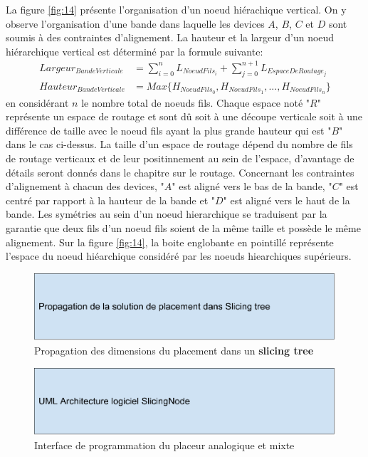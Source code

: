La figure \ref{fig:14} présente l'organisation d'un noeud hiérachique vertical. On y observe l'organisation d'une bande dans laquelle les devices $A$, $B$, $C$ et $D$ sont soumis à des contraintes d'alignement. La hauteur et la largeur d'un noeud hiérarchique vertical est déterminé par la formule suivante:
\begin{equation}
\begin{aligned}
Largeur_{BandeVerticale} &= \sum_{i=0}^{n} L_{NoeudFils_i} + \sum_{j=0}^{n+1} L_{EspaceDeRoutage_j} \\
Hauteur_{BandeVerticale} &= Max\{H_{NoeudFils_0},H_{NoeudFils_1}, ... , H_{NoeudFils_n}\}
\end{aligned}
\end{equation}
en considérant $n$ le nombre total de noeuds fils. Chaque espace noté "$R$" représente un espace de routage et sont dû soit à une découpe verticale soit à une différence de taille avec le noeud fils ayant la plus grande hauteur qui est "$B$" dans le cas ci-dessus. La taille d'un espace de routage dépend du nombre de fils de routage verticaux et de leur positinnement au sein de l'espace, d'avantage de détails seront donnés dans le chapitre sur le routage. Concernant les contraintes d'alignement à chacun des devices, "$A$" est aligné vers le bas de la bande, "$C$" est centré par rapport à la hauteur de la bande et "$D$" est aligné vers le haut de la bande. Les symétries au sein d'un noeud hierarchique se traduisent par la garantie que deux fils d'un noeud fils soient de la même taille et possède le même alignement. Sur la figure \ref{fig:14}, la boite englobante en pointillé représente l'espace du noeud hiéarchique considéré par les noeuds hiearchiques supérieurs.


\begin{figure}[h]
\begin{center}
\includegraphics[height=0.11\textheight]{Figures/15.pdf}
\caption{Propagation des dimensions du placement dans un \textbf{slicing tree}}
\label{fig:11}
\end{center}
\end{figure} 

\begin{figure}[h]
\begin{center}
\includegraphics[height=0.11\textheight]{Figures/11.pdf}
\caption{Interface de programmation du placeur analogique et mixte}
\label{fig:11}
\end{center}
\end{figure} 

